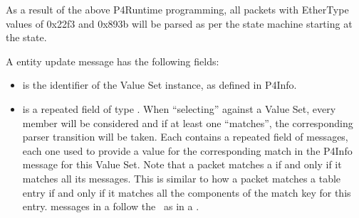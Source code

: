 \documentclass[11pt]{article}
\begin{document}
{%
\noindent{}As a result of the above P4Runtime programming, all packets with EtherType
values of 0x22f3 and 0x893b will be parsed as per the state machine starting at
the  state.%

A  entity update message has the following fields:%

\begin{itemize}%

\item{}
 is the  identifier of the Value Set instance, as
defined in P4Info.%

\item{}
 is a repeated field of type . When \textquotedblleft{}selecting\textquotedblright{}
against a Value Set, every member will be considered and if at least one
\textquotedblleft{}matches\textquotedblright{}, the corresponding parser transition will be taken. Each
 contains a repeated field of  messages, each one
used to provide a value for the corresponding match in the P4Info message for
this Value Set. Note that a packet matches a  if and only if
it matches all its  messages. This is similar to how a packet
matches a table entry if and only if it matches all the components of the
match key for this entry.  messages in a  follow
the~ as in a .%
\end{itemize}%

}
\end{document}
